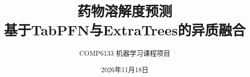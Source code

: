 \documentclass{assignment}
\title{药物溶解度预测\\基于TabPFN与ExtraTrees的异质融合}
\author{COMP6133 机器学习课程项目}
\date{2026年11月18日}
\begin{document}
\maketitle
\tableofcontents
\newpage









\FloatBarrier
\newcommand{\BIBdecl}{\fontsize{10}{13}\selectfont\setlength{\itemsep}{0.1em}\setlength{\parsep}{0pt}}


\end{document}
